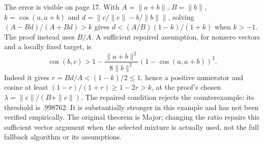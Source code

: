 \documentclass[10pt]{article}
\begin{document}
The error is visible on page 17. With \(A=\|a+b\|\), \(B=\|b\|\), \(k=\cos(a,a+b)\) and \(d=\|c/\|c\|-b/\|b\|\|\), solving \((A-Bd)/(A+Bd)>k\) gives \(d<(A/B)(1-k)/(1+k)\) when \(k>-1\). The proof instead uses \(B/A\). A sufficient repaired assumption, for nonzero vectors and a locally fixed target, is \[\cos(b,c)>1-\frac{\|a+b\|^2}{8\|b\|^2}
                       (1-\cos(a,a+b))^2.\] Indeed it gives \(r=Bd/A<(1-k)/2\leq1\), hence a positive numerator and cosine at least \((1-r)/(1+r)\geq1-2r>k\), at the proof’s chosen \(\lambda=\|c\|/(B+\|c\|)\). The repaired condition rejects the counterexample: its threshold is \(.998762\). It is substantially stronger in this example and has not been verified empirically. The original theorem is Major; changing the ratio repairs this sufficient vector argument when the selected mixture is actually used, not the full fallback algorithm or its assumptions.\par
\end{document}
